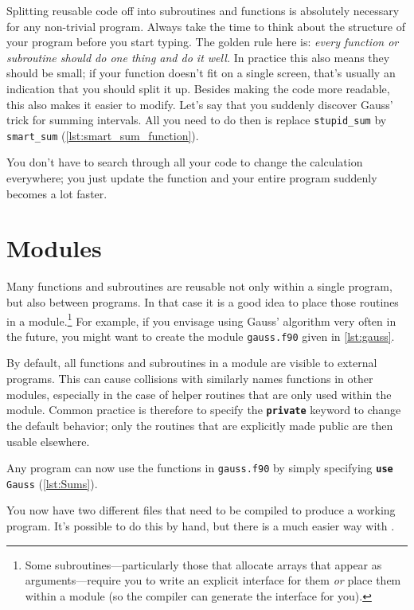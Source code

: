 \documentclass[openany,oneside]{report}
\newcommand{\keyword}[1]{\texttt{\bfseries\color{DarkBlue}#1}}
\begin{document}
Splitting reusable code off into subroutines and functions is absolutely necessary for any non-trivial program.
Always take the time to think about the structure of your program before you start typing.
The golden rule here is: \emph{every function or subroutine should do one thing and do it well.}
In practice this also means they should be small; if your function doesn't fit on a single screen, that's usually an indication that you should split it up.
Besides making the code more readable, this also makes it easier to modify.
Let's say that you suddenly discover Gauss' trick for summing intervals.
All you need to do then is replace \texttt{stupid\_sum} by \texttt{smart\_sum} (\autoref{lst:smart_sum_function}).

You don't have to search through all your code to change the calculation everywhere; you just update the function and your entire program suddenly becomes a lot faster.

\section{Modules}

Many functions and subroutines are reusable not only within a single program, but also between programs.
In that case it is a good idea to place those routines in a module.\footnote{Some subroutines---particularly those that allocate arrays that appear as arguments---require you to write an explicit interface for them \emph{or} place them within a module (so the compiler can generate the interface for you).}
For example, if you envisage using Gauss' algorithm very often in the future, you might want to create the module \texttt{gauss.f90} given in \autoref{lst:gauss}.

By default, all functions and subroutines in a module are visible to external programs.
This can cause collisions with similarly names functions in other modules, especially in the case of helper routines that are only used within the module.
Common practice is therefore to specify the \keyword{private} keyword to change the default behavior; only the routines that are explicitly made public are then usable elsewhere.

Any program can now use the functions in \texttt{gauss.f90} by simply specifying \texttt{\keyword{use} Gauss} (\autoref{lst:Sums}).

You now have two different files that need to be compiled to produce a working program.
It's possible to do this by hand, but there is a much easier way with .
\end{document}
